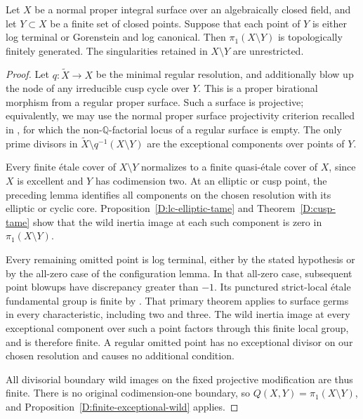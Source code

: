 \begin{corollary}
\label{D:Gorenstein-lc-boundary}
Let $X$ be a normal proper integral surface over an algebraically
closed field, and let $Y\subset X$ be a finite set of closed
points.  Suppose that each point of $Y$ is either log terminal
or Gorenstein and log canonical.  Then $\pi_1(X\setminus Y)$ is topologically
finitely generated.  The singularities retained in
$X\setminus Y$ are unrestricted.
\end{corollary}
\begin{proof}
Let $q:\widetilde X\to X$ be the minimal regular resolution,
and additionally blow up the node of any irreducible cusp
cycle over $Y$.  This is a proper birational morphism from
a regular proper surface.  Such a surface is projective;
equivalently, we may use the normal proper surface
projectivity criterion recalled in
\cite[introduction, pp.~1--2]{Schroer1999D}, for which the
non-$\mathbb Q$-factorial locus of a regular surface is empty.
The only prime divisors in
$\widetilde X\setminus q^{-1}(X\setminus Y)$ are the
exceptional components over points of $Y$.

Every finite \'etale cover of $X\setminus Y$ normalizes to
a finite quasi-\'etale cover of $X$, since $X$ is excellent
and $Y$ has codimension two.  At an elliptic or cusp point,
the preceding lemma identifies all components on the
chosen resolution with its elliptic or cyclic core.
Proposition~\ref{D:lc-elliptic-tame} and
Theorem~\ref{D:cusp-tame} show that the wild inertia image
at each such component is zero in $\pi_1(X\setminus Y)$.

Every remaining omitted point is log terminal, either by
the stated hypothesis or by the all-zero case of the
configuration lemma.  In that all-zero case, subsequent
point blowups have discrepancy greater than $-1$.
Its punctured strict-local \'etale fundamental group is
finite by \cite[Theorem 5.3, p.~739]{CarvajalRojasYasuda2025B}.
That primary theorem applies to surface germs in every
characteristic, including two and three.  The wild inertia
image at every exceptional component over such a point
factors through this finite local group, and is therefore
finite.  A regular omitted point has no exceptional divisor
on our chosen resolution and causes no additional condition.

All divisorial boundary wild images on the fixed projective
modification are thus finite.  There is no original
codimension-one boundary, so
$Q(X,Y)=\pi_1(X\setminus Y)$, and
Proposition~\ref{D:finite-exceptional-wild} applies.
\end{proof}
